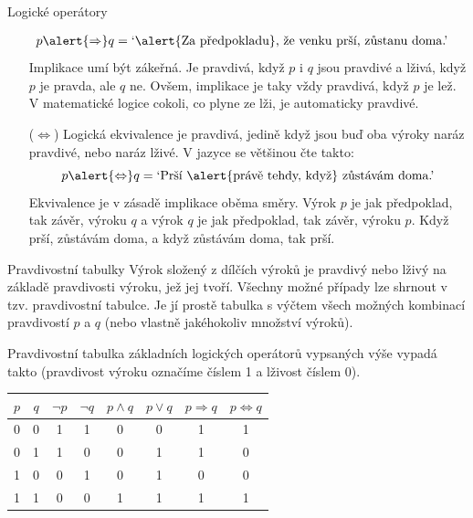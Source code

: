 \documentclass[final]{beamer}
\newlength{\colwidth}
\begin{document}
\begin{frame}[t]
\begin{columns}[t]
\begin{column}{\colwidth}
\begin{exampleblock}{Logické operátory}
\begin{itemize}[left=40pt]
\begin{align*}
              p \alert{ \Rightarrow } q &= \text{`\alert{Za předpokladu}, že
                venku prší, zůstanu doma.'}
            \end{align*}
            Implikace umí být zákeřná. Je pravdivá, když $p$ i $q$ jsou pravdivé
            a lživá, když $p$ je pravda, ale $q$ ne. Ovšem, implikace je taky
            \alert{vždy pravdivá}, když $p$ je \alert{lež}. V matematické logice
            cokoli, co plyne ze lži, je automaticky pravdivé.
          \item[($ \Leftrightarrow $)] 
            Logická \alert{ekvivalence} je pravdivá, jedině když jsou buď oba
            výroky naráz pravdivé, nebo naráz lživé. V jazyce se většinou čte
            takto:
            \[
              p \alert{ \Leftrightarrow }q = \text{`Prší \alert{právě tehdy,
              když} zůstávám doma.'}
            \]
            Ekvivalence je v zásadě implikace oběma směry. Výrok $p$ je jak
            předpoklad, tak závěr, výroku $q$ a výrok $q$ je jak předpoklad, tak
            závěr, výroku $p$. Když prší, zůstávám doma, a když zůstávám doma,
            tak prší.
        \end{itemize}
      \end{exampleblock}

      \begin{block}{Pravdivostní tabulky}
        Výrok složený z dílčích výroků je pravdivý nebo lživý na základě
        pravdivosti výroku, jež jej tvoří. Všechny možné případy lze shrnout v
        tzv. \alert{pravdivostní tabulce}. Je jí prostě tabulka s výčtem všech
        možných kombinací pravdivostí $p$ a $q$ (nebo vlastně jakéhokoliv
        množství výroků).  

        Pravdivostní tabulka základních logických operátorů vypsaných výše
        vypadá takto (pravdivost výroku označíme číslem \alert{1} a lživost
        číslem \alert{0}).
        \begin{center}
          \begin{tabular}{c | c | c | c | c | c | c | c}
            $p$ & $q$ & $\neg p$ & $\neg q$ & $p \wedge q$ & $p \vee
            q$ & $p \Rightarrow
            q$ & $p \Leftrightarrow q$\\
            \toprule
            0 & 0 & 1 & 1 & 0 & 0 & 1 & 1\\
            \midrule
            0 & 1 & 1 & 0 & 0 & 1 & 1 & 0\\
            \midrule
            1 & 0 & 0 & 1 & 0 & 1 & 0 & 0\\
            \midrule
            1 & 1 & 0 & 0 & 1 & 1 & 1 & 1
          \end{tabular}
        \end{center}
      \end{block}
    \end{column}


\end{columns}
\end{frame}
\end{document}
